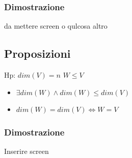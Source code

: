 \documentclass{article}
\begin{document}
\subsubsection*{Dimostrazione}
da mettere screen o qulcosa altro

\subsection*{Proposizioni}
\begin{flushleft}
	Hp: $dim(V)=n$ $W \leq V$
\end{flushleft}
\begin{itemize}
	\item $ \exists dim(W) \land dim(W)\leq dim(V)$
	\item $dim(W)=dim(V) \iff W=V$
\end{itemize}
\subsubsection*{Dimostrazione}
Inserire screen
\end{document}
